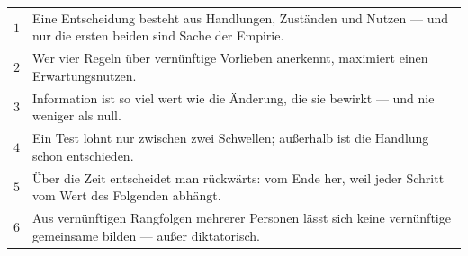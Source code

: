 \begin{merksatz}
\begin{center}
{\small
\renewcommand{\arraystretch}{1.55}
\begin{tabular}{@{}P{0.7cm}P{7.7cm}@{}}
\toprule
$1$ & Eine Entscheidung besteht aus Handlungen, Zuständen und Nutzen --- und nur die ersten beiden sind Sache der Empirie.\\
$2$ & Wer vier Regeln über vernünftige Vorlieben anerkennt, maximiert einen Erwartungsnutzen.\\
$3$ & Information ist so viel wert wie die Änderung, die sie bewirkt --- und nie weniger als null.\\
$4$ & Ein Test lohnt nur zwischen zwei Schwellen; außerhalb ist die Handlung schon entschieden.\\
$5$ & Über die Zeit entscheidet man rückwärts: vom Ende her, weil jeder Schritt vom Wert des Folgenden abhängt.\\
$6$ & Aus vernünftigen Rangfolgen mehrerer Personen lässt sich keine vernünftige gemeinsame bilden --- außer diktatorisch.\\
\bottomrule
\end{tabular}}
\end{center}
\end{merksatz}

